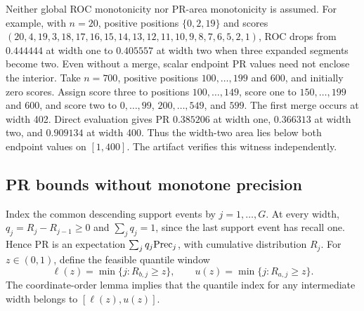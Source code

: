 Neither global ROC monotonicity nor PR-area monotonicity is assumed.
For example, with $n=20$, positive positions $\{0,\allowbreak 2,\allowbreak 19\}$ and scores
$(20,\allowbreak 4,\allowbreak 19,\allowbreak 3,\allowbreak 18,\allowbreak 17,\allowbreak 16,\allowbreak 15,\allowbreak 14,\allowbreak 13,\allowbreak 12,\allowbreak 11,\allowbreak 10,\allowbreak 9,\allowbreak 8,\allowbreak 7,\allowbreak 6,\allowbreak 5,\allowbreak 2,\allowbreak 1)$,
ROC drops from $0.444444$ at width one to $0.405557$ at width two when
three expanded segments become two.
Even without a merge, scalar endpoint PR values need not enclose the
interior. Take $n=700$, positive positions $100,\allowbreak \ldots,\allowbreak 199$ and $600$,
and initially zero scores. Assign score three to positions $100,\allowbreak \ldots,\allowbreak 149$,
score one to $150,\allowbreak \ldots,\allowbreak 199$ and $600$, and score two to
$0,\allowbreak \ldots,\allowbreak 99$, $200,\allowbreak \ldots,\allowbreak 549$, and $599$. The first merge occurs at
width 402. Direct evaluation gives PR $0.385206$ at width one,
$0.366313$ at width two, and $0.909134$ at width 400.
Thus the width-two area lies below both endpoint values on $[1,\allowbreak 400]$.
The artifact verifies this witness independently.

\subsection{PR bounds without monotone precision}
Index the common descending support events by $j=1,\allowbreak \ldots,\allowbreak G$.
At every width, $q_j=R_j-R_{j-1}\ge0$ and $\sum_jq_j=1$, since the
last support event has recall one. Hence PR is an expectation
$\sum_j q_j\mathrm{Prec}_j$, with cumulative distribution $R_j$.
For $z\in(0,\allowbreak 1)$, define the feasible quantile window
\[
 \ell(z)=\min\{j:R_{b,j}\ge z\},\qquad
 u(z)=\min\{j:R_{a,j}\ge z\}.
\]
The coordinate-order lemma implies that the quantile index for any
intermediate width belongs to $[\ell(z),\allowbreak u(z)]$.

